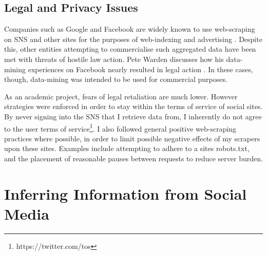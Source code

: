



\subsection{Legal and Privacy Issues}

Companies such as Google and Facebook are widely known to use web-scraping on SNS and other sites for the purposes of web-indexing and advertising \cite{no_api_for_me}. Despite this, other entities attempting to commercialise such aggregated data have been met with threats of hostile law action. Pete Warden discusses how his data-mining experiences on Facebook nearly resulted in legal action \cite{facebook_sued}. In these cases, though, data-mining was intended to be used for commercial purposes. 

As an academic project, fears of legal retaliation are much lower. However strategies were enforced in order to stay within the terms of service of social sites. By never signing into the SNS that I retrieve data from, I inherently do not agree to the user terms of service\footnote{https://twitter.com/tos}. I also followed general positive web-scraping practices where possible, in order to limit possible negative effects of my scrapers upon these sites. Examples include attempting to adhere to a sites robots.txt, and the placement of reasonable pauses between requests to reduce server burden. 

\section{Inferring Information from Social Media}

